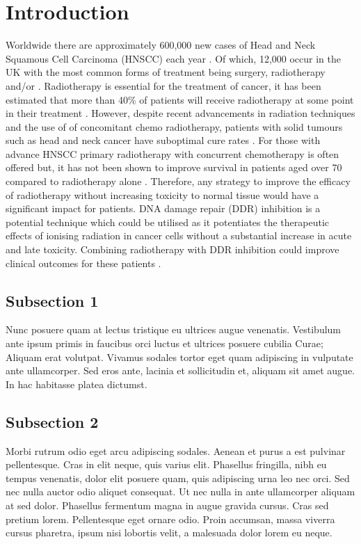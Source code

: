 \section{Introduction}

Worldwide there are approximately 600,000 new cases of Head and Neck Squamous Cell Carcinoma (HNSCC) each year \cite{stransky_mutational_2011}. Of which, 12,000 occur in the UK with the most common forms of treatment being surgery, radiotherapy and/or \cite{cancer_research_uk_head_2017}. Radiotherapy is essential for the treatment of cancer, it has been estimated that more than 40\% of patients will receive radiotherapy at some point in their treatment \cite{round_radiotherapy_2013}. However, despite recent advancements in radiation techniques and the use of of concomitant chemo radiotherapy, patients with solid tumours such as head and neck cancer have suboptimal cure rates \cite{cancer_research_uk_head_2017,cognetti_head_2008}. For those with advance HNSCC primary radiotherapy with concurrent chemotherapy is often offered but, it has not been shown to improve survival in patients aged over 70 compared to radiotherapy alone \cite{pignon_chemotherapy_2000}. Therefore, any strategy to improve the efficacy of radiotherapy without increasing toxicity to normal tissue would have a significant impact for patients. DNA damage repair (DDR) inhibition is a potential technique which could be utilised as it potentiates the therapeutic effects of ionising radiation in cancer cells without a substantial increase in acute and late toxicity. Combining radiotherapy with DDR inhibition could improve clinical outcomes for these patients \cite{chalmers_science_2016}.  


\subsection{Subsection 1}

Nunc posuere quam at lectus tristique eu ultrices augue venenatis. Vestibulum ante ipsum primis in faucibus orci luctus et ultrices posuere cubilia Curae; Aliquam erat volutpat. Vivamus sodales tortor eget quam adipiscing in vulputate ante ullamcorper. Sed eros ante, lacinia et sollicitudin et, aliquam sit amet augue. In hac habitasse platea dictumst.


\subsection{Subsection 2}
Morbi rutrum odio eget arcu adipiscing sodales. Aenean et purus a est pulvinar pellentesque. Cras in elit neque, quis varius elit. Phasellus fringilla, nibh eu tempus venenatis, dolor elit posuere quam, quis adipiscing urna leo nec orci. Sed nec nulla auctor odio aliquet consequat. Ut nec nulla in ante ullamcorper aliquam at sed dolor. Phasellus fermentum magna in augue gravida cursus. Cras sed pretium lorem. Pellentesque eget ornare odio. Proin accumsan, massa viverra cursus pharetra, ipsum nisi lobortis velit, a malesuada dolor lorem eu neque.

